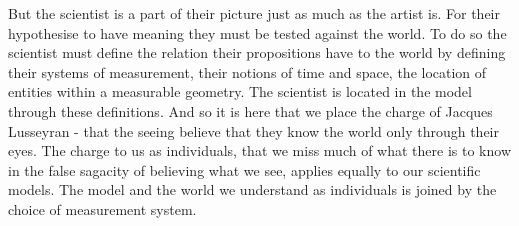 

%
%
%
%
%
%
%
%
%

But the scientist is a part of their picture just as much as the artist is.
For their hypothesise to have meaning they must be tested against the world.
To do so the scientist must define the relation their propositions have to the world by defining their systems of measurement, their notions of time and space,
the location of entities within a measurable geometry.  The scientist is located in the model through these definitions.
And so it is here that we place the charge of Jacques Lusseyran - that the seeing believe that they know the world only through their eyes.
The charge to us as individuals, that we miss much of what there is to know in the false sagacity of believing what we see, 
applies equally to our scientific models.  
The model and the world we understand as individuals is joined by the choice of measurement system.

